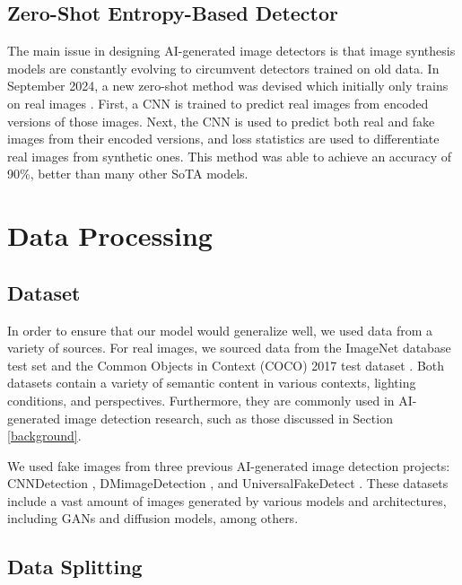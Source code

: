 \documentclass{article} %
\begin{document}
\subsection{Zero-Shot Entropy-Based Detector}
\label{ZED}

The main issue in designing AI-generated image detectors is that image synthesis models are constantly evolving to circumvent detectors trained on old data. In September 2024, a new zero-shot method was devised which initially only trains on real images \citep{cozzolino2024zeroshotdetectionaigeneratedimages}. First, a CNN is trained to predict real images from encoded versions of those images. Next, the CNN is used to predict both real and fake images from their encoded versions, and loss statistics are used to differentiate real images from synthetic ones. This method was able to achieve an accuracy of 90\%, better than many other SoTA models.

\section{Data Processing}

\subsection{Dataset}

In order to ensure that our model would generalize well, we used data from a variety of sources. For real images, we sourced data from the ImageNet database test set \citep{5206848} and the Common Objects in Context (COCO) 2017 test dataset \citep{lin2015microsoft}. Both datasets contain a variety of semantic content in various contexts, lighting conditions, and perspectives. Furthermore, they are commonly used in AI-generated image detection research, such as those discussed in Section \ref{background}.

We used fake images from three previous AI-generated image detection projects: CNNDetection
\citep{wang2020cnngeneratedimagessurprisinglyeasy}, DMimageDetection \citep{corvi2022detectionsyntheticimagesgenerated}, and UniversalFakeDetect
\citep{ojha2024universalfakeimagedetectors}. These datasets include a vast amount of images generated by various models and architectures, including GANs and diffusion models, among others.

\subsection{Data Splitting}
\end{document}
